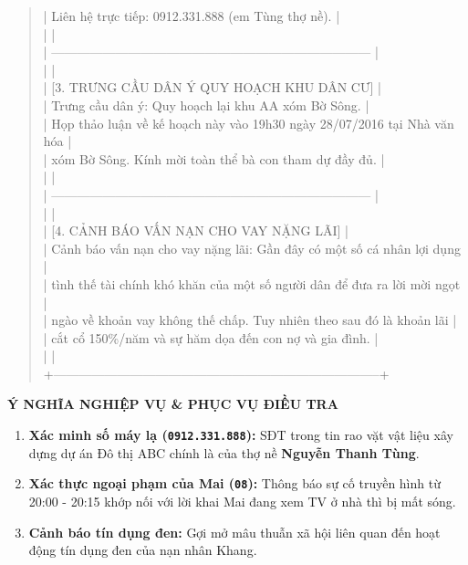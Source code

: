 \documentclass[12pt,a4paper]{article}
\begin{document}
\begin{quote}
| Liên hệ trực tiếp: 0912.331.888 (em Tùng thợ nề).                           |\\
|                                                                             |\\
| --------------------------------------------------------------------------- |\\
|                                                                             |\\
| [3. TRƯNG CẦU DÂN Ý QUY HOẠCH KHU DÂN CƯ]                                   |\\
| Trưng cầu dân ý: Quy hoạch lại khu AA xóm Bờ Sông.                          |\\
| Họp thảo luận về kế hoạch này vào 19h30 ngày 28/07/2016 tại Nhà văn hóa     |\\
| xóm Bờ Sông. Kính mời toàn thể bà con tham dự đầy đủ.                       |\\
|                                                                             |\\
| --------------------------------------------------------------------------- |\\
|                                                                             |\\
| [4. CẢNH BÁO VẤN NẠN CHO VAY NẶNG LÃI]                                      |\\
| Cảnh báo vấn nạn cho vay nặng lãi: Gần đây có một số cá nhân lợi dụng      |\\
| tình thế tài chính khó khăn của một số người dân để đưa ra lời mời ngọt     |\\
| ngào về khoản vay không thế chấp. Tuy nhiên theo sau đó là khoản lãi        |\\
| cắt cổ 150\%/năm và sự hăm dọa đến con nợ và gia đình.                      |\\
|                                                                             |\\
+-----------------------------------------------------------------------------+\\
\end{quote}




\vspace{0.3cm}\noindent\textbf{\large Ý NGHĨA NGHIỆP VỤ \& PHỤC VỤ ĐIỀU TRA}\\[0.15cm]

\begin{enumerate}[label=\arabic*., leftmargin=*, itemsep=2pt, topsep=2pt, parsep=0pt]
  \item \textbf{Xác minh số máy lạ (\texttt{0912.331.888}):} SĐT trong tin rao vặt vật liệu xây dựng dự án Đô thị ABC chính là của thợ nề \textbf{Nguyễn Thanh Tùng}.
  \item \textbf{Xác thực ngoại phạm của Mai (\texttt{08}):} Thông báo sự cố truyền hình từ 20:00 - 20:15 khớp nối với lời khai Mai đang xem TV ở nhà thì bị mất sóng.
  \item \textbf{Cảnh báo tín dụng đen:} Gợi mở mâu thuẫn xã hội liên quan đến hoạt động tín dụng đen của nạn nhân Khang.
\end{enumerate}
\end{document}
